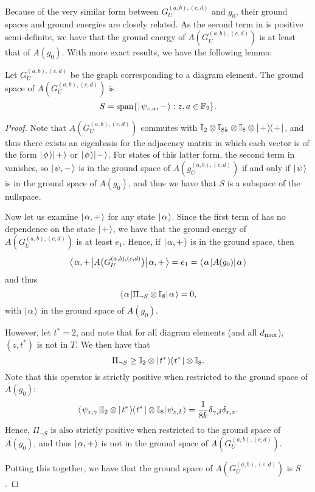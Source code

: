 \documentclass[../thesis-main/thesis-main]{subfiles}
\begin{document}
Because of the very similar form between $G_U^{(a,b),(c,d)}$ and $g_0$, their ground spaces and ground energies are closely related.  As the second term in  is positive semi-definite, we have that the ground energy of $A(G_U^{(a,b),(c,d)})$ is at least that of $A(g_0)$. With more exact results, we have the following lemma:
\begin{lemma}
  Let $G_{U}^{(a,b),(c,d)}$ be the graph corresponding to a diagram element.  The ground space of $A(G_U^{(a,b),(c,d)})$ is
  \begin{equation}
    S = \operatorname{span}\{ |\mspace{2mu} \psi_{z,a},- \mspace{2mu} \rangle : z,a\in \mathbb{F}_2\}.
  \end{equation}
  \label{lem:diagram_element_ground}
\end{lemma}
\begin{proof}
  Note that $A(G_U^{(a,b),(c,d)})$ commutes with $\mathbb{I}_{2}\otimes \mathbb{I}_{8k} \otimes \mathbb{I}_8 \otimes |\mspace{2mu} + \mspace{2mu} \rangle\mspace{-2mu}\langle\mspace{2mu} + \mspace{2mu} |$, and thus there exists an eigenbasis for the adjacency matrix in which each vector is of the form $|\mspace{2mu} \phi \mspace{2mu} \rangle|\mspace{2mu} + \mspace{2mu} \rangle$ or $|\mspace{2mu} \phi \mspace{2mu} \rangle|\mspace{2mu} - \mspace{2mu} \rangle$.   For states of this latter form, the second term in  vanishes, so  $|\mspace{2mu} \psi,- \mspace{2mu} \rangle$ is in the ground space of $A(g_U^{(a,b),(c,d)})$ if and only if $|\mspace{2mu} \psi \mspace{2mu} \rangle$ is in the ground space of $A(g_0)$, and thus we have that $S$ is a subspace of the nullspace.
  
  Now let us examine $|\mspace{2mu} \alpha,+ \mspace{2mu} \rangle$ for any state $|\mspace{2mu} \alpha \mspace{2mu} \rangle$.  Since the first term of  has no dependence on the state $|\mspace{2mu} + \mspace{2mu} \rangle$, we have that the ground energy of $A(G_U^{(a,b),(c,d)})$ is at least $e_1$.  Hence, if $|\mspace{2mu} \alpha,+ \mspace{2mu} \rangle$ is in the ground space, then 
\begin{equation}
  \big\langle\mspace{2mu} \alpha,+ \mspace{2mu} \big| A\big(G_U^{(a,b),(c,d)}\big) \big|\mspace{2mu} \alpha,+ \mspace{2mu} \big\rangle = e_1 = \langle\mspace{2mu} \alpha \mspace{2mu} | A(g_0) |\mspace{2mu} \alpha \mspace{2mu} \rangle
\end{equation}
and thus 
\begin{equation}
  \langle\mspace{2mu} \alpha \mspace{2mu} | \Pi_{\lnot S}\otimes \mathbb{I}_8 |\mspace{2mu} \alpha \mspace{2mu} \rangle = 0,
\end{equation}
with $|\mspace{2mu} \alpha \mspace{2mu} \rangle$ in the ground space of $A(g_0)$.
  
  However, let $t^* = 2$, and note that for all diagram elements (and all $d_{\text{max}}$), $(z,t^*)$ is not in $T$.  We then have that
  \begin{equation}
    \Pi_{\lnot S} \geq \mathbb{I}_2 \otimes |\mspace{2mu} t^* \mspace{2mu} \rangle\mspace{-2mu}\langle\mspace{2mu} t^* \mspace{2mu} | \otimes \mathbb{I}_8.
  \end{equation}
  Note that this operator is strictly positive when restricted to the ground space of $A(g_0)$:
  \begin{equation}
    \langle\mspace{2mu} \psi_{x,\gamma} \mspace{2mu} | \mathbb{I}_2 \otimes |\mspace{2mu} t^* \mspace{2mu} \rangle\mspace{-2mu}\langle\mspace{2mu} t^* \mspace{2mu} | \otimes \mathbb{I}_8 |\mspace{2mu} \psi_{z,\delta} \mspace{2mu} \rangle = \frac{1}{8k} \delta_{\gamma,\delta} \delta_{x,z}.
  \end{equation}
  Hence, $\Pi_{\lnot S}$ is also strictly positive when restricted to the ground space of $A(g_0)$, and thus $|\mspace{2mu} \alpha,+ \mspace{2mu} \rangle$ is not in the ground space of $A(G_U^{(a,b),(c,d)})$.
  
  Putting this together, we have that the ground space of $A(G_U^{(a,b),(c,d)})$ is $S$. 
\end{proof}
\end{document}
